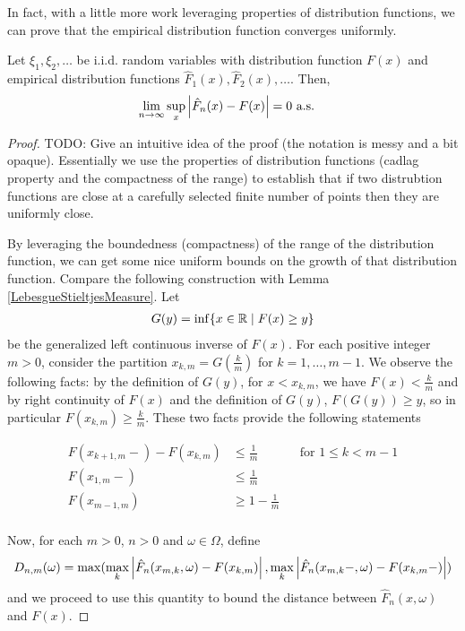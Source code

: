 In fact, with a little more work leveraging properties of distribution
functions, we can prove that the empirical
distribution function converges uniformly.
\begin{thm}\label{GlivenkoCantelli}Let $\xi_1, \xi_2, \dots$ be i.i.d. random variables with
  distribution function $F(x)$ and empirical distribution functions
  $\hat{F}_1(x), \hat{F}_2(x), \dots$.  Then,
\begin{align*}
\lim_{n \to \infty} \sup_x \left \vert \hat{F}_n(x) - F(x) \right \vert &= 0 \text{ a.s.}
\end{align*}
\end{thm}
\begin{proof} 
TODO: Give an intuitive idea of the proof (the notation is messy and a
bit opaque).  Essentially we use the properties of distribution
functions (cadlag property and the compactness of the range) to
establish that if two distrubtion functions are close at a carefully
selected finite number of points then they are uniformly close.

By leveraging the boundedness (compactness) of the range of the
distribution function, we can get some nice uniform bounds on the
growth of that distribution function.  Compare the following
construction with Lemma \ref{LebesgueStieltjesMeasure}.
Let 
\begin{align*}
G(y) = \inf \lbrace x \in \mathbb{R} \mid F(x) \geq y \rbrace
\end{align*}
be the generalized left continuous inverse of $F(x)$.  For each positive integer $m >
0$, consider the partition $x_{k,m} = G(\frac{k}{m})$ for $k=1, \dots,
m-1$.  We observe the following facts: by the definition of $G(y)$, for $x < x_{k,m}$, we have $F(x) < \frac{k}{m}$
and by right continuity of $F(x)$ and the definition of $G(y)$,
$F(G(y)) \geq y$, so in particular $F(x_{k,m}) \geq \frac{k}{m}$.  These two facts provide the following statements

\begin{align*}
F(x_{k+1,m}-)  - F(x_{k,m}) &\leq \frac{1}{m} & &\text{for $1 \leq k <
  m-1$} \\
F(x_{1,m}-) &\leq \frac{1}{m} \\
F(x_{m-1,m}) &\geq 1 - \frac{1}{m} \\
\end{align*}

Now, for each $m > 0$, $n > 0$ and $\omega \in \Omega$, define 
\begin{align*}
D_{n,m}(\omega) = \max(\max_{k} \left \vert \hat{F}_n(x_{m,k}, \omega) -
  F(x_{k,m}) \right \vert, \max_k \left \vert \hat{F}_n(x_{m,k}-, \omega) - F(x_{k,m}-) \right \vert
)
\end{align*}
and we proceed to use this quantity to bound the distance between
$\hat{F}_n(x, \omega)$ and $F(x)$.  


\end{proof}
